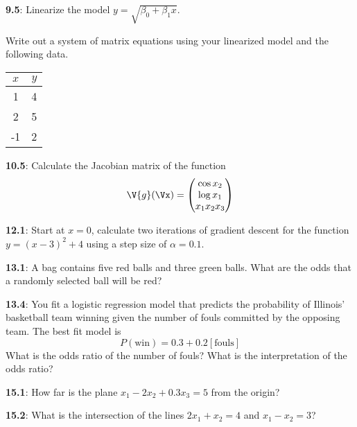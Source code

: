 \documentclass[pal,wide,12pt]{pajarticle}
\newenvironment{problem}[1]{\noindent\textbf{#1}:}{\newpage}
\begin{document}
\begin{problem}{9.5}
Linearize the model $y = \sqrt{\beta_0 + \beta_1x}$.

\vspace{3in}
\noindent
Write out a system of matrix equations using your linearized model and the following data.
\begin{center}
	\begin{tabular}{cc}
		\toprule
		$x$ & $y$ \\
		\midrule
		1 & 4 \\
		2 & 5 \\
		-1 & 2 \\
		\bottomrule	
	\end{tabular}
\end{center}
\end{problem}

\begin{problem}{10.5}
Calculate the Jacobian matrix of the function
\[ \V{g}(\Vx) = \begin{pmatrix} \cos x_2 \\ \log x_1 \\ x_1 x_2 x_3 \end{pmatrix} \]
\end{problem}

\begin{problem}{12.1}
Start at $x=0$, calculate two iterations of gradient descent for the function $y = (x - 3)^2 + 4$ using a step size of $\alpha=0.1$.
\end{problem}

\begin{problem}{13.1}
A bag contains five red balls and three green balls. What are the odds that a randomly selected ball will be red?
\end{problem}

\begin{problem}{13.4}
You fit a logistic regression model that predicts the probability of Illinois' basketball team winning given the number of fouls committed by the opposing team. The best fit model is
\[ P(\text{win}) = 0.3 + 0.2[\text{fouls}] \]
What is the odds ratio of the number of fouls? What is the interpretation of the odds ratio?
\end{problem}

\begin{problem}{15.1}
How far is the plane $x_1 -2x_2 + 0.3x_3 = 5$ from the origin?
\end{problem}

\begin{problem}{15.2}
What is the intersection of the lines $2x_1 + x_2 = 4$ and $x_1 - x_2 = 3$?
\end{problem}
\end{document}
